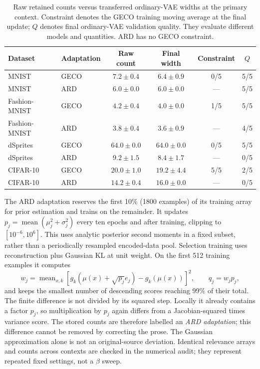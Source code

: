 \documentclass[make,article,submit,pdftex,moreauthors]{Definitions/mdpi}
\begin{document}
\begin{table}[H]
\caption{Raw retained counts versus transferred ordinary-VAE widths at the primary context. Constraint denotes the GECO training moving average at the final update; $Q$ denotes final ordinary-VAE validation quality. They evaluate different models and quantities. ARD has no GECO constraint.}\label{tab:pruning}
\footnotesize
\setlength{\tabcolsep}{3.5pt}
\begin{tabular*}{\textwidth}{@{\extracolsep{\fill}}llcccc@{}}
\toprule
Dataset & Adaptation & Raw count & Final width & Constraint & $Q$ \\
\midrule
MNIST & GECO & $7.2 \pm 0.4$ & $6.4 \pm 0.9$ & 0/5 & 5/5 \\
MNIST & ARD & $6.0 \pm 0.0$ & $6.0 \pm 0.0$ & --- & 5/5 \\
Fashion-MNIST & GECO & $4.2 \pm 0.4$ & $4.0 \pm 0.0$ & 1/5 & 5/5 \\
Fashion-MNIST & ARD & $3.8 \pm 0.4$ & $3.6 \pm 0.9$ & --- & 4/5 \\
dSprites & GECO & $64.0 \pm 0.0$ & $64.0 \pm 0.0$ & 0/5 & 5/5 \\
dSprites & ARD & $9.2 \pm 1.5$ & $8.4 \pm 1.7$ & --- & 0/5 \\
CIFAR-10 & GECO & $20.0 \pm 1.0$ & $19.2 \pm 4.4$ & 5/5 & 2/5 \\
CIFAR-10 & ARD & $14.2 \pm 0.4$ & $16.0 \pm 0.0$ & --- & 0/5 \\
\bottomrule
\end{tabular*}
\end{table}


The ARD adaptation reserves the first 10\% (1800 examples) of its
training array for prior estimation and trains on the remainder.
It updates $p_j=\operatorname{mean}(\mu_j^2+\sigma_j^2)$ every ten
epochs and after training, clipping to $[10^{-6},10^6]$.
This uses analytic posterior second moments in a fixed subset, rather
than a periodically resampled encoded-data pool. Selection training uses
reconstruction plus Gaussian KL at unit weight. On the first 512
training examples it computes
\begin{equation}
 w_j=\operatorname{mean}_{x,k}
 [g_k(\mu(x)+\sqrt{p_j}e_j)-g_k(\mu(x))]^2,
 \qquad q_j=w_jp_j,
 \label{eq:ardlocal}
\end{equation}
and keeps the smallest number of descending scores reaching 99\% of
their total. The finite difference is not divided by its squared step.
Locally it already contains a factor $p_j$, so multiplication by $p_j$
again differs from a Jacobian-squared times variance score. The stored
counts are therefore labelled an \emph{ARD adaptation}; this difference
cannot be removed by correcting the prose. The Gaussian approximation
alone is not an original-source deviation. Identical relevance arrays
and counts across contexts are checked in the numerical audit; they
represent repeated fixed settings, not a $\beta$ sweep.
\end{document}
